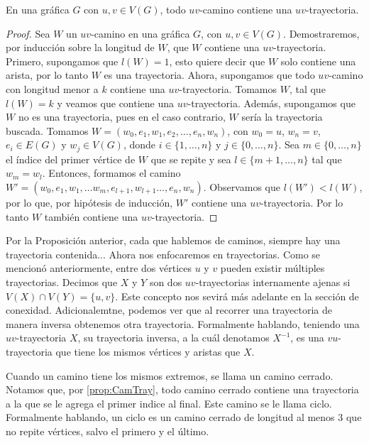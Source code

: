 
    \begin{proposicion}
        En una gr\'afica $G$ con $u, v \in V(G)$, todo $uv$-camino contiene una
        $uv$-trayectoria.
    \end{proposicion}
    \label{prop:CamTray}

    \begin{proof}
        Sea $W$ un $uv$-camino en una gr\'afica $G$, con $u,v \in V(G)$.
        Demostraremos, por inducci\'on sobre la longitud de $W$, que $W$
        contiene una $uv$-trayectoria. Primero, supongamos que $l(W)=1$, esto
        quiere decir que $W$ solo contiene una arista, por lo tanto $W$ es una
        trayectoria. Ahora, supongamos que todo $uv$-camino con longitud menor a
        $k$ contiene una $uv$-trayectoria. Tomamos $W$, tal que $l(W) = k$ y
        veamos que contiene una $uv$-trayectoria. Adem\'as, supongamos que $W$
        no es una trayectoria, pues en el caso contrario, $W$ ser\'ia la
        trayectoria buscada. Tomamos $W= (w_0,e_1,w_1,e_2, \dots, e_n,w_n)$, con
        $w_0=u$, $w_n=v$, $e_i \in E(G)$ y $w_j \in V(G)$, donde $i \in \{1,
        \dots, n\}$ y $j \in \{0, \dots, n\}$. Sea $m \in \{0, \dots, n\}$ el
        \'indice del primer v\'ertice de $W$ que se repite y sea $l \in \{m+1,
        \dots, n\}$ tal que $w_m = w_l$. Entonces, formamos el camino $W'=
        (w_0,e_1,w_1,\dots w_m, e_{l+1}, w_{l+1} \dots, e_n,w_n)$. Observamos
        que $l(W')<l(W)$, por lo que, por hip\'otesis de inducci\'on, $W'$
        contiene una $uv$-trayectoria. Por lo tanto $W$ tambi\'en contiene una
        $uv$-trayectoria.
    \end{proof}
    
    Por la Proposici\'on anterior, cada que hablemos de caminos, siempre hay una
   trayectoria contenida... Ahora nos enfocaremos en trayectorias. Como se
   mencion\'o anteriormente, entre dos v\'ertices $u$ y $v$ pueden existir
   m\'ultiples trayectorias. Decimos que $X$ y $Y$ son dos $uv$-trayectorias
   internamente ajenas si $V(X)\cap V(Y)=\{u,v\}$. Este concepto nos sevir\'a
   m\'as adelante en la secci\'on de conexidad. Adicionalemtne, podemos ver que
   al recorrer una trayectoria de manera inversa obtenemos otra trayectoria.
   Formalmente hablando, teniendo una $uv$-trayectoria $X$, su trayectoria
   inversa, a la cu\'al denotamos $X^{-1}$, es una $vu$-trayectoria que tiene
   los mismos v\'ertices y aristas que $X$.

    Cuando un camino tiene los mismos extremos, se llama un camino cerrado.
    Notamos que, por \cref{prop:CamTray}, todo camino cerrado contiene una
    trayectoria a la que se le agrega el primer indice al final. Este camino se
    le llama ciclo. Formalmente hablando, un ciclo es un camino cerrado de
    longitud al menos $3$ que no repite v\'ertices, salvo el primero y el
    \'ultimo.
    
